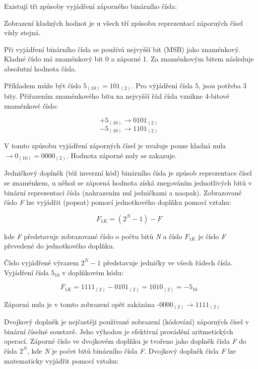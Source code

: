 Existují tři způsoby vyjádření záporného binárního čísla:

\vskip 4mm
\vskip 4mm

Zobrazení kladných hodnot je u všech tří způsobu reprezentací záporných čísel vždy stejná.

Při vyjádření binárního čísla se používá nejvyšší bit (MSB) jako znaménkový. Kladné číslo má znaménkový bit 0 a záporné 1. Za znaménkovým bitem následuje absolutní hodnota čísla. 

Příkladem může být číslo $5_{(10)} = 101_{(2)}$. Pro výjádření čísla 5, jsou potřeba 3 bity. Přiřazením znaménkového bitu na nejvyšší řád čísla vznikne 4-bitové znaménkové číslo:

$$ +5_{(10)} \rightarrow 0101_{(2)} $$
$$ -5_{(10)} \rightarrow 1101_{(2)} $$ 

V tomto způsobu vyjádření záporných čísel je uvažuje pouze kladná nula $\rightarrow 0_{(10)} = 0000_{(2)}$. Hodnota záporné nuly se zakazuje.


Jedničkový doplněk (též inverzní kód) binárního čísla je způsob reprezentace čísel se znaménkem, u něhož se záporná hodnota získá znegováním jednotlivých bitů v binární reprezentaci čísla (nahrazením nul jedničkami a naopak). Zobrazované číslo {\it F} lze vyjádřit (popsat) pomocí jednotkového doplňku pomocí vztahu:

$$ F_{1K} = (2^N - 1) - F $$

kde {\it F} představuje zobrazované číslo o počtu bitů {\it N} a číslo $F_{1K}$ je číslo {\it F} převedené do jednotkového doplňku.

Číslo vyjádřené výrazem $2^N - 1$ představuje jedničky ve všech řádech čísla. Vyjádření čísla $5_{10}$ v doplňkovém kódu:

$$ F_{1K} = 1111_{(2)} - 0101_{(2)} = 1010_{(2)} = -5_{10} $$

Záporná nula je v tomto zobrazení opět zakázána -$0000_{(2)} \rightarrow 1111_{(2)}$ 


Dvojkový doplněk je nejčastěji používané zobrazení (kódování) záporných čísel v binární číselné soustavě. Jeho výhodou je efektivní provádění aritmetických operací. Záporné číslo ve dvojkovém doplňku je tvořeno jako doplněk čísla {\it F} do čísla $2^N$, kde {\it N} je počet bitů binárního čísla {\it F}. Dvojkový doplněk čísla {\it F} lze matematicky vyjádřit pomocí vztahu:

